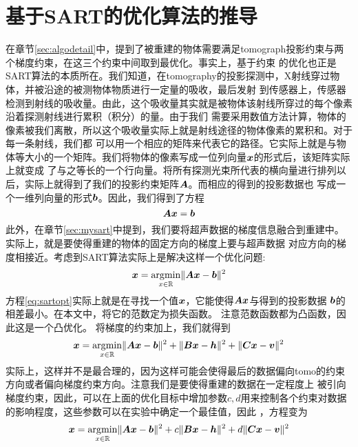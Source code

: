 \section{基于SART的优化算法的推导}
在章节\ref{sec:algodetail}中，提到了被重建的物体需要满足tomograph投影约束与两个梯度约束，在这三个约束中间取到最优化。事实上，基于约束
的优化也正是SART算法的本质所在。我们知道，在tomography的投影探测中，X射线穿过物体，并被沿途的被测物体物质进行一定量的吸收，最后发射
到传感器上，传感器检测到射线的吸收量。由此，这个吸收量其实就是被物体该射线所穿过的每个像素沿着探测射线进行累积（积分）的量。由于我们
需要采用数值方法计算，物体的像素被我们离散，所以这个吸收量实际上就是射线途径的物体像素的累积和。对于每一条射线，我们都
可以用一个相应的矩阵来代表它的路径。它实际上就是与物体等大小的一个矩阵。我们将物体的像素写成一位列向量$\bm{ x}$的形式后，该矩阵实际上就变成
了与之等长的一个行向量。将所有探测光束所代表的横向量进行排列以后，实际上就得到了我们的投影约束矩阵$\bm{ A}$。而相应的得到的投影数据也
写成一个一维列向量的形式$\bm{b}$。因此，我们得到了方程
\begin{equation}
\bm{ A}\bm{ x} = \bm{b} \label{eq:tomocon}
\end{equation}
此外，在章节\ref{sec:mysart}中提到，我们要将超声数据的梯度信息融合到重建中。实际上，就是要使得重建的物体的固定方向的梯度上要与超声数据
对应方向的梯度相接近。考虑到SART算法实际上是解决这样一个优化问题:
\begin{equation}
\bm{ x} = \operatorname*{\arg\!\min}_{x\in\mathbb{R}}\lVert\bm{ A}\bm{ x}-\bm{b}\rVert^2 \label{eq:sartopt}
\end{equation}
方程\eqref{eq:sartopt}实际上就是在寻找一个值$\bm{ x}$，它能使得$\bm{ A}\bm{ x}$与得到的投影数据 $\bm{b}$的相差最小。在本文中，将它的范数定为损失函数。
注意范数函数都为凸函数，因此这是一个凸优化。
将梯度的约束加上，我们就得到
\begin{equation}
\bm{ x} = \operatorname*{\arg\!\min}_{x\in\mathbb{R}}\lVert\bm{ A}\bm{ x}-\bm{b}\rVert^2 +\lVert\bm{ B}\bm{ x}-\bm{ h}\rVert^2+\lVert\bm{C}\bm{ x}-\bm{ v}\rVert^2 \notag
\end{equation}
实际上，这样并不是最合理的，因为这样可能会使得最后的数据偏向tomo的约束方向或者偏向梯度约束方向。注意我们是要使得重建的数据在一定程度上
被引向梯度约束，因此，可以在上面的优化目标中增加参数$c,d$用来控制各个约束对数据的影响程度，这些参数可以在实验中确定一个最佳值，因此
，方程变为
\begin{equation}
\bm{ x} = \operatorname*{\arg\!\min}_{x\in\mathbb{R}}\lVert\bm{ A}\bm{ x}-\bm{b}\rVert^2 +c\lVert\bm{ B}\bm{ x}-\bm{ h}\rVert^2+d\lVert\bm{C}\bm{ x}-\bm{ v}\rVert^2 
\end{equation}





